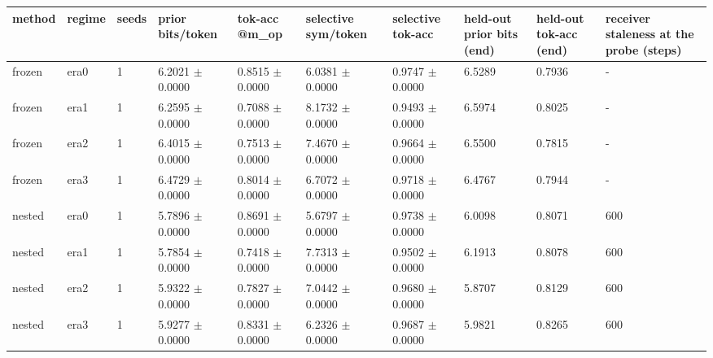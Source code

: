 \begin{tabular}{llllllllll}
\hline
method & regime & seeds & prior bits/token & tok-acc @m\_op & selective sym/token & selective tok-acc & held-out prior bits (end) & held-out tok-acc (end) & receiver staleness at the probe (steps) \\
\hline
frozen & era0 & 1 & 6.2021 $\pm$ 0.0000 & 0.8515 $\pm$ 0.0000 & 6.0381 $\pm$ 0.0000 & 0.9747 $\pm$ 0.0000 & 6.5289 & 0.7936 & - \\
frozen & era1 & 1 & 6.2595 $\pm$ 0.0000 & 0.7088 $\pm$ 0.0000 & 8.1732 $\pm$ 0.0000 & 0.9493 $\pm$ 0.0000 & 6.5974 & 0.8025 & - \\
frozen & era2 & 1 & 6.4015 $\pm$ 0.0000 & 0.7513 $\pm$ 0.0000 & 7.4670 $\pm$ 0.0000 & 0.9664 $\pm$ 0.0000 & 6.5500 & 0.7815 & - \\
frozen & era3 & 1 & 6.4729 $\pm$ 0.0000 & 0.8014 $\pm$ 0.0000 & 6.7072 $\pm$ 0.0000 & 0.9718 $\pm$ 0.0000 & 6.4767 & 0.7944 & - \\
nested & era0 & 1 & 5.7896 $\pm$ 0.0000 & 0.8691 $\pm$ 0.0000 & 5.6797 $\pm$ 0.0000 & 0.9738 $\pm$ 0.0000 & 6.0098 & 0.8071 & 600 \\
nested & era1 & 1 & 5.7854 $\pm$ 0.0000 & 0.7418 $\pm$ 0.0000 & 7.7313 $\pm$ 0.0000 & 0.9502 $\pm$ 0.0000 & 6.1913 & 0.8078 & 600 \\
nested & era2 & 1 & 5.9322 $\pm$ 0.0000 & 0.7827 $\pm$ 0.0000 & 7.0442 $\pm$ 0.0000 & 0.9680 $\pm$ 0.0000 & 5.8707 & 0.8129 & 600 \\
nested & era3 & 1 & 5.9277 $\pm$ 0.0000 & 0.8331 $\pm$ 0.0000 & 6.2326 $\pm$ 0.0000 & 0.9687 $\pm$ 0.0000 & 5.9821 & 0.8265 & 600 \\
\hline
\end{tabular}
